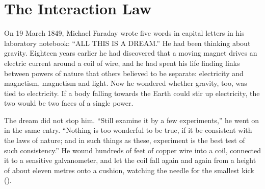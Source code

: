 \providecommand{\Com}{\operatorname{Com}}
\providecommand{\Sh}{\operatorname{Sh}}
\chapter{The Interaction Law}\label{ch:interaction}



On 19 March 1849, Michael Faraday wrote five words in capital letters in his laboratory notebook: \enquote{ALL THIS IS A DREAM.} He had been thinking about gravity. Eighteen years earlier he had discovered that a moving magnet drives an electric current around a coil of wire, and he had spent his life finding links between powers of nature that others believed to be separate: electricity and magnetism, magnetism and light. Now he wondered whether gravity, too, was tied to electricity. If a body falling towards the Earth could stir up electricity, the two would be two faces of a single power.

The dream did not stop him. \enquote{Still examine it by a few experiments,} he went on in the same entry. \enquote{Nothing is too wonderful to be true, if it be consistent with the laws of nature; and in such things as these, experiment is the best test of such consistency.} He wound hundreds of feet of copper wire into a coil, connected it to a sensitive galvanometer, and let the coil fall again and again from a height of about eleven metres onto a cushion, watching the needle for the smallest kick ().

